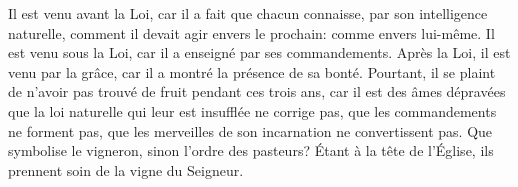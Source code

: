 Il est venu avant la Loi,
	car il a fait que chacun connaisse, par son intelligence naturelle,
	comment il devait agir envers le prochain:
	comme envers lui-même.
Il est venu sous la Loi, car il a enseigné par ses commandements.
Après la Loi, il est venu par la grâce, car il a montré la présence de sa bonté.
Pourtant, il se plaint de n'avoir pas trouvé de fruit pendant ces trois ans,
	car il est des âmes dépravées
		que la loi naturelle qui leur est insufflée ne corrige pas,
	que les commandements ne forment pas,
	que les merveilles de son incarnation ne convertissent pas.
Que symbolise le vigneron, sinon l'ordre des pasteurs?
Étant à la tête de l'Église, ils prennent soin de la vigne du Seigneur.
